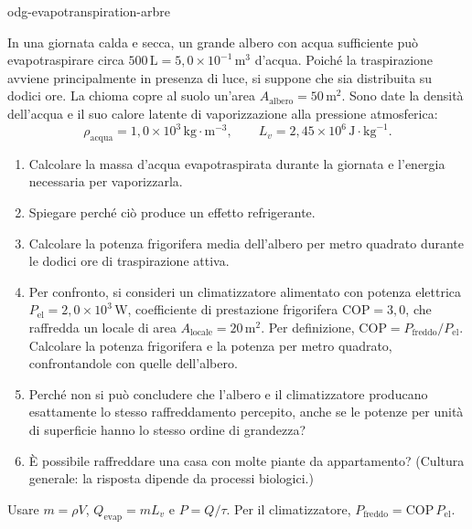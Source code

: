 \begin{exo}{odg-evapotranspiration-arbre}

In una giornata calda e secca, un grande albero con acqua sufficiente può evapotraspirare circa $500\,\text{L}=5{,}0\times10^{-1}\,\text{m}^3$ d'acqua. Poiché la traspirazione avviene principalmente in presenza di luce, si suppone che sia distribuita su dodici ore. La chioma copre al suolo un'area $A_{\text{albero}}=50\,\text{m}^2$. Sono date la densità dell'acqua e il suo calore latente di vaporizzazione alla pressione atmosferica:
\[
\rho_{\text{acqua}}=1{,}0\times10^3\,\text{kg}\!\cdot\!\text{m}^{-3},
\qquad L_v=2{,}45\times10^6\,\text{J}\!\cdot\!\text{kg}^{-1}.
\]

\begin{enumerate}
  \item Calcolare la massa d'acqua evapotraspirata durante la giornata e l'energia necessaria per vaporizzarla.
  \item Spiegare perché ciò produce un effetto refrigerante.
  \item Calcolare la potenza frigorifera media dell'albero per metro quadrato durante le dodici ore di traspirazione attiva.
  \item Per confronto, si consideri un climatizzatore alimentato con potenza elettrica $P_{\mathrm{el}}=2{,}0\times10^3\,\text{W}$, coefficiente di prestazione frigorifera $\mathrm{COP}=3{,}0$, che raffredda un locale di area $A_{\text{locale}}=20\,\text{m}^2$. Per definizione, $\mathrm{COP}=P_{\text{freddo}}/P_{\mathrm{el}}$. Calcolare la potenza frigorifera e la potenza per metro quadrato, confrontandole con quelle dell'albero.
  \item Perché non si può concludere che l'albero e il climatizzatore producano esattamente lo stesso raffreddamento percepito, anche se le potenze per unità di superficie hanno lo stesso ordine di grandezza?
  \item È possibile raffreddare una casa con molte piante da appartamento? (Cultura generale: la risposta dipende da processi biologici.)
\end{enumerate}

\begin{indication}
Usare $m=\rho V$, $Q_{\mathrm{evap}}=mL_v$ e $P=Q/\tau$. Per il climatizzatore, $P_{\text{freddo}}=\mathrm{COP}\,P_{\mathrm{el}}$.
\end{indication}


\end{exo}
